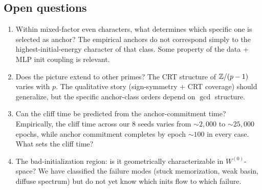 \subsection{Open questions}
\label{subsec:bgeo-open}

\begin{enumerate}[leftmargin=*]
  \item Within mixed-factor even characters, what determines which specific
        one is selected as anchor?  The empirical anchors do not
        correspond simply to the highest-initial-energy character of
        that class.  Some property of the data + MLP init coupling is
        relevant.
  \item Does the picture extend to other primes?  The CRT structure of
        $\mathbb{Z}/(p-1)$ varies with $p$.  The qualitative story (sign-symmetry
        + CRT coverage) should generalize, but the specific anchor-class
        orders depend on $\gcd$ structure.
  \item Can the cliff time be predicted from the anchor-commitment time?
        Empirically, the cliff time across our $8$ seeds varies from
        $\sim 2{,}000$ to $\sim 25{,}000$ epochs, while anchor commitment
        completes by epoch $\sim 100$ in every case.  What sets the
        cliff time?
  \item The bad-initialization region: is it geometrically characterizable
        in $W^{(0)}$-space?  We have classified the failure modes (stuck
        memorization, weak basin, diffuse spectrum) but do not yet know
        which inits flow to which failure.
\end{enumerate}
